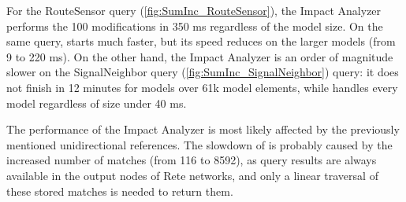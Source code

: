 For the \textsf{RouteSensor} query (\autoref{fig:SumInc_RouteSensor}), the Impact
Analyzer performs the 100 modifications in 350 ms regardless of the model
size. On the same query, \incquery{} starts much faster, but its speed reduces
on the larger models (from 9 to 220 ms). On the other hand, the Impact
Analyzer is an order of magnitude slower on the \textsf{SignalNeighbor} query
(\autoref{fig:SumInc_SignalNeighbor}) query: it does not finish in 12 minutes
for models over 61k model elements, while \incquery{} handles every model
regardless of size under 40 ms.

The performance of the Impact Analyzer is most likely affected by the previously
mentioned unidirectional references. The slowdown of \incquery{} is probably
caused by the increased number of matches (from 116 to 8592), as query
results are always available in the output nodes of Rete networks, and only a
linear traversal of these stored matches is needed to return them.


